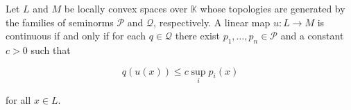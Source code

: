 Let $L$ and $M$ be locally convex spaces over $\mathbb{K}$ whose topologies are generated by the families of seminorms $\mathcal{P}$ and $\mathcal{Q}$, respectively. A linear map $u: L \to M$ is continuous if and only if for each $q \in \mathcal{Q}$ there exist $p_1, \ldots, p_n \in \mathcal{P}$ and a constant $c > 0$ such that

$$q(u(x)) \leq c \sup_i p_i(x)$$

for all $x \in L$.
